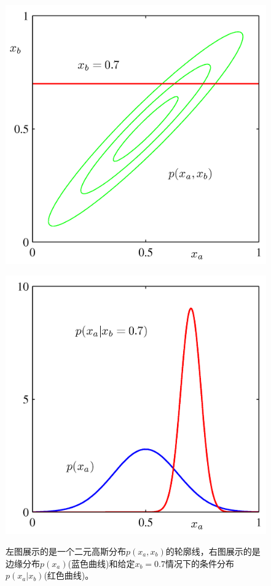 \documentclass[b5paper]{book}
\numberwithin{equation}{chapter}
\begin{document}
{\begin{figure}[ht]
\begin{minipage}[t]{0.5\linewidth}
		\includegraphics[scale=0.8]{Images/2-9a.png}
		\label{fig:2-9a}
		\end{minipage}
		\begin{minipage}[t]{0.5\linewidth}
		\centering
		\includegraphics[scale=0.8]{Images/2-9b.png}
		\label{fig:2-9b}
		\end{minipage}
		\caption{左图展示的是一个二元高斯分布$p(x_a,x_b)$的轮廓线，右图展示的是边缘分布$p(x_a)$(蓝色曲线)和给定$x_b=0.7$情况下的条件分布$p(x_a|x_b)$(红色曲线)。}
	\end{figure}
	}
\end{document}
